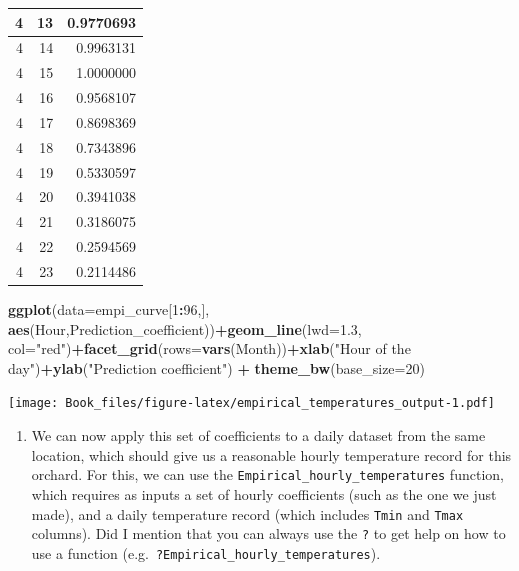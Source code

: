 \documentclass[
]{book}
\newenvironment{Shaded}{\begin{snugshade}}{\end{snugshade}}
\newcommand{\DataTypeTok}[1]{\textcolor[rgb]{0.13,0.29,0.53}{#1}}
\newcommand{\DecValTok}[1]{\textcolor[rgb]{0.00,0.00,0.81}{#1}}
\newcommand{\FloatTok}[1]{\textcolor[rgb]{0.00,0.00,0.81}{#1}}
\newcommand{\KeywordTok}[1]{\textcolor[rgb]{0.13,0.29,0.53}{\textbf{#1}}}
\newcommand{\NormalTok}[1]{#1}
\newcommand{\OperatorTok}[1]{\textcolor[rgb]{0.81,0.36,0.00}{\textbf{#1}}}
\newcommand{\StringTok}[1]{\textcolor[rgb]{0.31,0.60,0.02}{#1}}
\providecommand{\tightlist}{%
  \setlength{\itemsep}{0pt}\setlength{\parskip}{0pt}}
\begin{document}
\begin{tabular}{r|r|r}
\hline
4 & 13 & 0.9770693\\
\hline
4 & 14 & 0.9963131\\
\hline
4 & 15 & 1.0000000\\
\hline
4 & 16 & 0.9568107\\
\hline
4 & 17 & 0.8698369\\
\hline
4 & 18 & 0.7343896\\
\hline
4 & 19 & 0.5330597\\
\hline
4 & 20 & 0.3941038\\
\hline
4 & 21 & 0.3186075\\
\hline
4 & 22 & 0.2594569\\
\hline
4 & 23 & 0.2114486\\
\hline
\end{tabular}
\endgroup{}

\begin{Shaded}
\begin{Highlighting}[]
\KeywordTok{ggplot}\NormalTok{(}\DataTypeTok{data=}\NormalTok{empi_curve[}\DecValTok{1}\OperatorTok{:}\DecValTok{96}\NormalTok{,], }\KeywordTok{aes}\NormalTok{(Hour,Prediction_coefficient))}\OperatorTok{+}\KeywordTok{geom_line}\NormalTok{(}\DataTypeTok{lwd=}\FloatTok{1.3}\NormalTok{, }\DataTypeTok{col=}\StringTok{"red"}\NormalTok{)}\OperatorTok{+}\KeywordTok{facet_grid}\NormalTok{(}\DataTypeTok{rows=}\KeywordTok{vars}\NormalTok{(Month))}\OperatorTok{+}\KeywordTok{xlab}\NormalTok{(}\StringTok{"Hour of the day"}\NormalTok{)}\OperatorTok{+}\KeywordTok{ylab}\NormalTok{(}\StringTok{"Prediction coefficient"}\NormalTok{) }\OperatorTok{+}\StringTok{ }\KeywordTok{theme_bw}\NormalTok{(}\DataTypeTok{base_size=}\DecValTok{20}\NormalTok{)}
\end{Highlighting}
\end{Shaded}

\texttt{[image: Book\_files/figure-latex/empirical\_temperatures\_output-1.pdf]}

\begin{enumerate}
\def\labelenumi{\arabic{enumi})}
\setcounter{enumi}{2}
\tightlist
\item
  We can now apply this set of coefficients to a daily dataset from the same location, which should give us a reasonable hourly temperature record for this orchard. For this, we can use the \texttt{Empirical\_hourly\_temperatures} function, which requires as inputs a set of hourly coefficients (such as the one we just made), and a daily temperature record (which includes \texttt{Tmin} and \texttt{Tmax} columns). Did I mention that you can always use the \texttt{?} to get help on how to use a function (e.g.~\texttt{?Empirical\_hourly\_temperatures}).
\end{enumerate}
\end{document}
